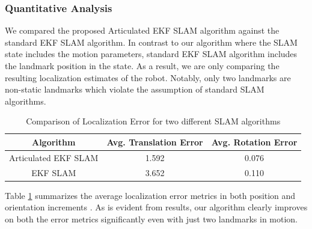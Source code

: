 \documentclass[conference]{IEEEtran}
\begin{document}
\subsubsection{Quantitative Analysis} We compared the proposed Articulated EKF SLAM algorithm against the standard EKF SLAM algorithm. In contrast to our algorithm where the SLAM state includes the motion parameters, standard EKF SLAM algorithm includes the landmark position in the state. As a result, we are only comparing the resulting localization estimates of the robot. Notably, only two landmarks are non-static landmarks which violate the assumption of standard SLAM algorithms.
\begin{table}
\center
\begin{tabular}{| c | c| c| }
\hline
  Algorithm & Avg. Translation Error & Avg. Rotation Error\\ \hline
  Articulated EKF SLAM & 1.592 & 0.076 \\ \hline
  EKF SLAM & 3.652 & 0.110 \\ \hline
\end{tabular}
\caption{Comparison of Localization Error for two different SLAM algorithms}
\label{tab:error_articulated_vs_normal}
\end{table}
Table \ref{tab:error_articulated_vs_normal} summarizes the average localization error metrics in both position and orientation increments \cite{kummerle2009measuring}. As is evident from results, our algorithm clearly improves on both the error metrics significantly even with just two landmarks in motion.

%  




\end{document}
